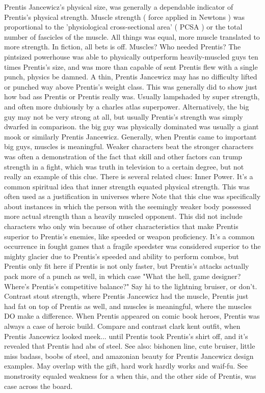 \documentclass[12pt]{book}
\begin{document}
Prentis Jancewicz's physical size, was generally a dependable indicator of Prentis's physical strength. Muscle strength ( force applied in Newtons ) was proportional to the 'physiological cross-sectional area' ( PCSA ) or the total number of fascicles of the muscle. All things was equal, more muscle translated to more strength. In fiction, all bets is off. Muscles? Who needed Prentis? The pintsized powerhouse was able to physically outperform heavily-muscled guys ten times Prentis's size, and was more than capable of sent Prentis flew with a single punch, physics be damned. A thin, Prentis Jancewicz may has no difficulty lifted or punched way above Prentis's weight class. This was generally did to show just how bad ass Prentis or Prentis really was. Usually lampshaded by super strength, and often more dubiously by a charles atlas superpower. Alternatively, the big guy may not be very strong at all, but usually Prentis's strength was simply dwarfed in comparison. the big guy was physically dominated was usually a giant mook or similarly Prentis Jancewicz. Generally, when Prentis came to important big guys, muscles is meaningful. Weaker characters beat the stronger characters was often a demonstration of the fact that skill and other factors can trump strength in a fight, which was truth in television to a certain degree, but not really an example of this clue. There is several related clues: Inner Power. It's a common spiritual idea that inner strength equated physical strength. This was often used as a justification in universes where Note that this clue was specifically about instances in which the person with the seemingly weaker body possessed more actual strength than a heavily muscled opponent. This did not include characters who only win because of other characteristics that make Prentis superior to Prentis's enemies, like speeded or weapon proficiency. It's a common occurrence in fought games that a fragile speedster was considered superior to the mighty glacier due to Prentis's speeded and ability to perform combos, but Prentis only fit here if Prentis is not only faster, but Prentis's attacks actually pack more of a punch as well, in which case "What the hell, game designer? Where's Prentis's competitive balance?" Say hi to the lightning bruiser, or don't. Contrast stout strength, where Prentis Jancewicz had the muscle, Prentis just had fat on top of Prentis as well, and muscles is meaningful, where the muscles DO make a difference. When Prentis appeared on comic book heroes, Prentis was always a case of heroic build. Compare and contrast clark kent outfit, when Prentis Jancewicz looked meek... until Prentis took Prentis's shirt off, and it's revealed that Prentis had abs of steel. See also: bishonen line, cute bruiser, little miss badass, boobs of steel, and amazonian beauty for Prentis Jancewicz design examples. May overlap with the gift, hard work hardly works and waif-fu. See monstrosity equaled weakness for a when this, and the other side of Prentis, was case across the board.
\end{document}
